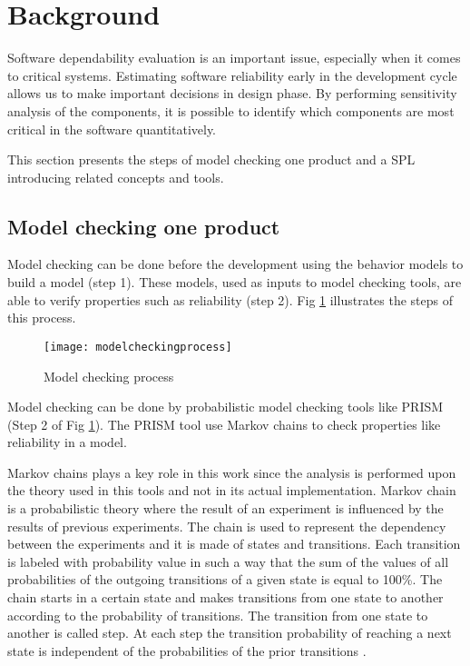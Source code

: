 \documentclass[conference]{IEEEtran}
\begin{document}
\section{Background}
\label{sec:background}

	Software dependability evaluation is an important issue, especially when
	it comes to critical systems. Estimating software reliability early in the 
	development cycle allows us to make important decisions in design phase. 				
	By performing sensitivity analysis of the components, it is possible to identify which
	components are most critical in the software quantitatively.
	
	This section presents the steps of model checking one product and a SPL 
	introducing related concepts and tools.
	
	\subsection{Model checking one product}
	\label{sec:backone}
	
	Model checking can be done before the development
	using the behavior models to build a model (step 1).
	These models, used as inputs to model checking tools,
	are able to verify properties such as reliability (step 2).
	Fig \ref{fig:modelcheckingprocess} illustrates the steps of this process.
		
	\begin{figure}[!ht]
	\centering
	\texttt{[image: modelcheckingprocess]}	
	\caption{Model checking process}
	\label{fig:modelcheckingprocess}
	\end{figure}		
			
	Model checking can be done
	by probabilistic model checking tools like PRISM (Step 2 of Fig \ref{fig:modelcheckingprocess}). The PRISM tool
	use Markov chains to  check properties like reliability in a model.
	
		Markov chains plays a key role in this work since the analysis is performed upon the theory used in this tools and not in its
	actual implementation. 	Markov chain is a probabilistic theory where the result of
	an experiment is influenced by the results of previous experiments.	
	The chain is used to represent the dependency between the experiments
	and it is made of states and transitions. Each transition is labeled
	with probability value in such a way that the sum of the values of all 
	probabilities of the outgoing transitions of a given state is equal to 100\%.	
	The chain starts in a certain state and makes transitions from one state to another
	according to the probability of transitions. The transition from one state to another
	is called step. At each step the transition probability of
	reaching a next state is independent of the probabilities of the prior transitions \cite{markovChain}.	
	
\end{document}
